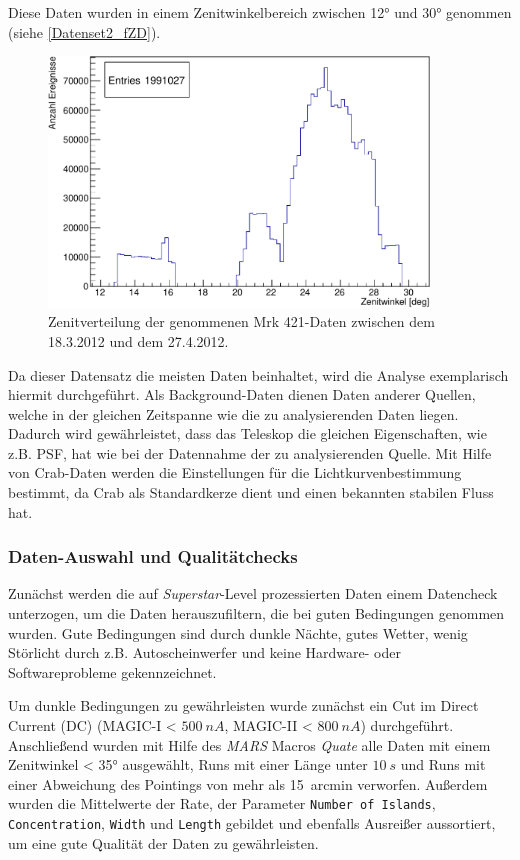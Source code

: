 Diese Daten wurden in einem Zenitwinkelbereich zwischen 12° und 30° genommen (siehe \autoref{Datenset2_fZD}).

\begin{figure}
    \centering
    \includegraphics[width=0.9\textwidth]{./Plots/04_MrkAnalyse/Datenset2/Datenset2_Mrk421_MPointingPos_fZd.pdf}
    \caption{Zenitverteilung der genommenen Mrk 421-Daten zwischen dem 18.3.2012 und dem 27.4.2012.}
    \label{Datenset2_fZD}
\end{figure}


Da dieser Datensatz die meisten Daten beinhaltet, wird die Analyse exemplarisch hiermit durchgeführt.
Als Background-Daten dienen Daten anderer Quellen, welche in der gleichen Zeitspanne wie die zu analysierenden Daten liegen.
Dadurch wird gewährleistet, dass das Teleskop die gleichen Eigenschaften, wie z.B. PSF, hat wie bei der Datennahme der zu analysierenden Quelle. 
Mit Hilfe von Crab-Daten werden die Einstellungen für die Lichtkurvenbestimmung bestimmt, da Crab als Standardkerze dient und einen bekannten stabilen Fluss hat. 


\subsubsection{Daten-Auswahl und Qualitätchecks}
Zunächst werden die auf \textit{Superstar}-Level prozessierten Daten einem Datencheck unterzogen, um die Daten herauszufiltern, die bei guten Bedingungen genommen wurden.
Gute Bedingungen sind durch dunkle Nächte, gutes Wetter, wenig Störlicht durch z.B. Autoscheinwerfer und keine Hardware- oder Softwareprobleme gekennzeichnet.

Um dunkle Bedingungen zu gewährleisten wurde zunächst ein Cut im Direct Current (DC) (MAGIC-I < $\SI{500}{nA}$, MAGIC-II < $\SI{800}{nA}$) durchgeführt.
Anschließend wurden mit Hilfe des \textit{MARS} Macros \textit{Quate} alle Daten mit einem Zenitwinkel < 35° ausgewählt, Runs mit einer Länge unter $\SI{10}{s}$ und Runs mit einer Abweichung des Pointings von mehr als \SI{15}{arcmin} verworfen.
Außerdem wurden die Mittelwerte der Rate, der Parameter \texttt{Number of Islands}, \texttt{Concentration}, \texttt{Width} und \texttt{Length} gebildet und ebenfalls Ausreißer aussortiert, um eine gute Qualität der Daten zu gewährleisten.

